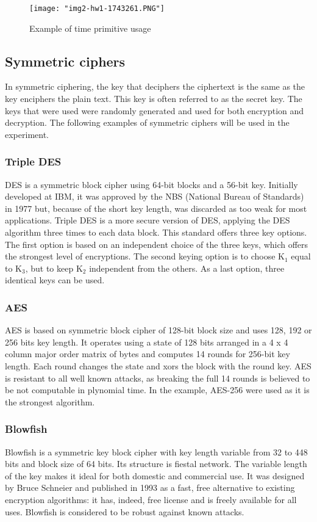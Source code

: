 \documentclass{article}
\begin{document}
\begin{figure}[h]
	\texttt{[image: "img2-hw1-1743261.PNG"]}
	\caption{Example of time primitive usage}
\end{figure} 

\subsection{Symmetric ciphers}
In symmetric ciphering, the key that deciphers the ciphertext is the same as the key enciphers the plain text. This key is often referred to as the secret key. The keys that were used were randomly generated and used for both encryption and decryption. The following examples of symmetric ciphers will be used in the experiment.

\subsubsection{Triple DES}
DES is a symmetric block cipher using 64-bit blocks and a 56-bit key. Initially developed at IBM, it was approved by the NBS (National Bureau of Standards) in 1977 but, because of the short key length, was discarded as too weak for most applications. Triple DES is a more secure version of DES, applying the DES algorithm three times to each data block. This standard offers three key options. The first option is based on an independent choice of the three keys, which offers the strongest level of encryptions. The second keying option is to choose K$_{1}$ equal to K$_{3}$, but to keep K$_{2}$ independent from the others. As a last option, three identical keys can be used.

\subsubsection{AES}
AES is based on symmetric block cipher of 128-bit block size and uses 128, 192 or 256 bits key length. It operates using a state of 128 bits arranged in a 4 x 4 column major order matrix of bytes and computes 14 rounds for 256-bit key length. Each round changes the state and xors the block with the round key. AES is resistant to all well known attacks, as breaking the full 14 rounds is believed to be not computable in plynomial time. In the example, AES-256 were used as it is the strongest algorithm.

\subsubsection{Blowfish}
Blowfish is a symmetric key block cipher with key length variable from 32 to 448 bits and block size of 64 bits. Its structure is fiestal network. The variable length of the key makes it ideal for both domestic and commercial use. It was designed by Bruce Schneier and published in 1993 as a fast, free alternative to existing encryption algorithms: it has, indeed, free license and is freely available for all uses. Blowfish is considered to be robust against known attacks.
\end{document}
